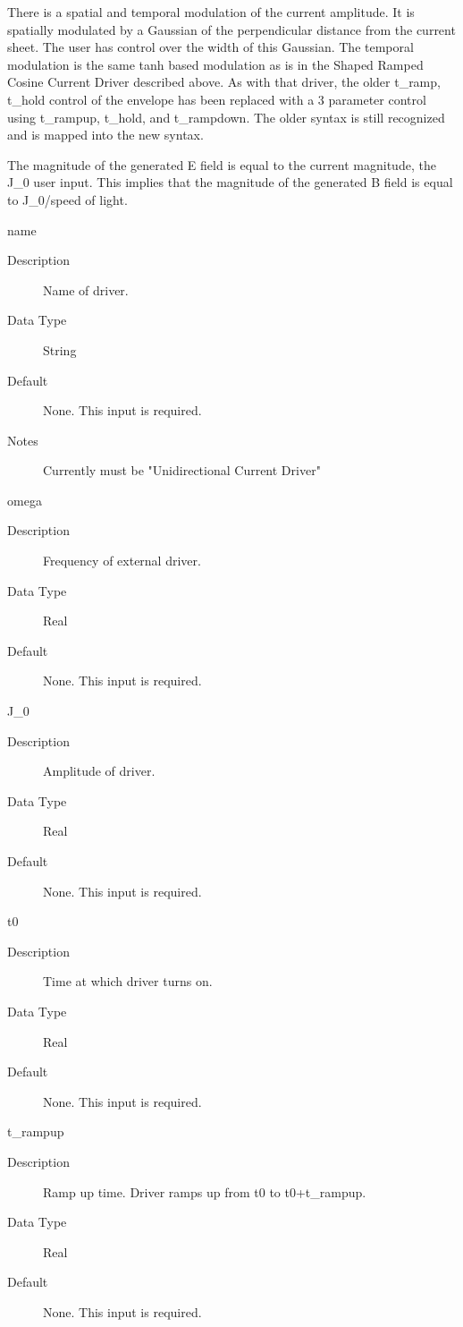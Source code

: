 \documentclass[11pt]{amsart}
\begin{document}
There is a spatial and temporal modulation of the current amplitude.  It is
spatially modulated by a Gaussian of the perpendicular distance from the current
sheet.  The user has control over the width of this Gaussian.  The temporal
modulation is the same tanh based modulation as is in the Shaped Ramped Cosine
Current Driver described above.  As with that driver, the older t\_ramp, t\_hold
control of the envelope has been replaced with a 3 parameter control using
t\_rampup, t\_hold, and t\_rampdown.  The older syntax is still recognized and
is mapped into the new syntax.

The magnitude of the generated E field is equal to the current magnitude, the
J\_0 user input.  This implies that the magnitude of the generated B field is
equal to J\_0/speed of light.

name
\begin{description}
\item [Description] Name of driver.
\item [Data Type] String
\item [Default] None.  This input is required.
\item [Notes] Currently must be "Unidirectional Current Driver"
\end{description}

omega
\begin{description}
\item [Description] Frequency of external driver.
\item [Data Type] Real
\item [Default] None.  This input is required.
\end{description}

J\_0
\begin{description}
\item [Description] Amplitude of driver.
\item [Data Type] Real
\item [Default] None.  This input is required.
\end{description}

t0
\begin{description}
\item [Description] Time at which driver turns on.
\item [Data Type] Real
\item [Default] None.  This input is required.
\end{description}

t\_rampup
\begin{description}
\item [Description] Ramp up time.  Driver ramps up from t0 to t0+t\_rampup.
\item [Data Type] Real
\item [Default] None.  This input is required.
\end{description}
\end{document}
